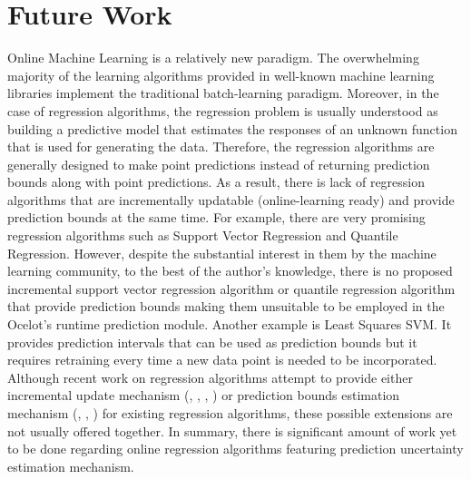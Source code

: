 \section{Future Work}

Online Machine Learning is a relatively new paradigm. The overwhelming majority of the learning algorithms provided in well-known machine learning libraries implement the traditional batch-learning paradigm. Moreover, in the case of regression algorithms, the regression problem is usually understood as building a predictive model that estimates the responses of an unknown function that is used for generating the data. Therefore, the regression algorithms are generally designed to make point predictions instead of returning prediction bounds along with point predictions. As a result, there is lack of regression algorithms that are incrementally updatable (online-learning ready) and provide prediction bounds at the same time. For example, there are very promising regression algorithms such as Support Vector Regression and Quantile Regression. However, despite the substantial interest in them by the machine learning community, to the best of the author's knowledge, there is no proposed incremental support vector regression algorithm or quantile regression algorithm that provide prediction bounds making them unsuitable to be employed in the Ocelot's runtime prediction module. Another example is Least Squares SVM. It provides prediction intervals that can be used as prediction bounds but it requires retraining every time a new data point is needed to be incorporated. Although recent work on regression algorithms attempt to provide either incremental update mechanism (\cite{poggio_incremental_2001}, \cite{martin_-line_2002}, \cite{ma_accurate_2003}, \cite{moller_time-adaptive_2008}) or prediction bounds estimation mechanism (\cite{chu_bayesian_2001}, \cite{de_brabanter_approximate_2011}, \cite{gao_probabilistic_2002}) for existing regression algorithms, these possible extensions are not usually offered together. In summary, there is significant amount of work yet to be done regarding online regression algorithms featuring prediction uncertainty estimation mechanism.



